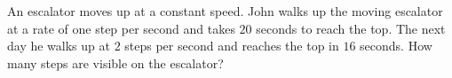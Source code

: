 An escalator moves up at a constant speed. John walks up the moving escalator at a rate of one step per second and takes $20$ seconds to reach the top. The next day he walks up at $2$ steps per second and reaches the top in $16$ seconds. How many steps are visible on the escalator?
